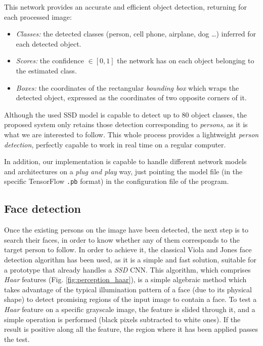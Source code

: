 This network provides an accurate and efficient object detection, returning for each processed image:
\begin{itemize}
	\item \emph{Classes:} the detected classes (person, cell phone, airplane, dog \dots) inferred for each detected object.
	\item \emph{Scores:} the confidence $\in [0,1]$ the network has on each object belonging to the estimated class.
	\item \emph{Boxes:} the coordinates of the rectangular \emph{bounding box} which wraps the detected object, expressed as the coordinates of two opposite corners of it.
\end{itemize}

Although the used SSD model is capable to detect up to 80 object classes, the proposed system only retains those detection corresponding to \emph{persons}, as it is what we are interested to follow. This whole process provides a lightweight \emph{person detection}, perfectly capable to work in real time on a regular computer.

In addition, our implementation is capable to handle different network models and architectures on a \emph{plug and play} way, just pointing the model file (in the specific TensorFlow \texttt{.pb} format) in the configuration file of the program.


\subsection{Face detection}

Once the existing persons on the image have been detected, the next step is to search their faces, in order to know whether any of them corresponds to the target person to follow. In order to achieve it, the classical Viola and Jones face detection algorithm \cite{viola-jones} has been used, as it is a simple and fast solution, suitable for a prototype that already handles a \emph{SSD} CNN. This algorithm, which comprises \emph{Haar} features (Fig. \ref{fig:perception_haar}), is a simple algebraic method which takes advantage of the typical illumination pattern of a face (due to its physical shape) to detect promising regions of the input image to contain a face. To test a \emph{Haar} feature on a specific grayscale image, the feature is slided through it, and a simple operation is performed (black pixels subtracted to white ones). If the result is positive along all the feature, the region where it has been applied passes the test.


